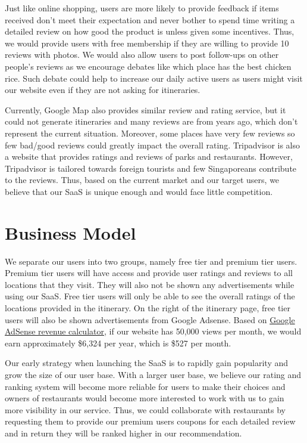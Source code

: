 \documentclass[a4paper]{article}
\begin{document}
Just like online shopping, users are more likely to provide feedback if items received don’t meet their expectation and never bother to spend time writing a detailed review on how good the product is unless given some incentives. Thus, we would provide users with free membership if they are willing to provide 10 reviews with photos. We would also allow users to post follow-ups on other people’s reviews as we encourage debates like which place has the best chicken rice. Such debate could help to increase our daily active users as users might visit our website even if they are not asking for itineraries.

Currently, Google Map also provides similar review and rating service, but it could not generate itineraries and many reviews are from years ago, which don't represent the current situation. Moreover, some places have very few reviews so few bad/good reviews could greatly impact the overall rating. Tripadvisor is also a website that provides ratings and reviews of parks and restaurants. However, Tripadvisor is tailored towards foreign tourists and few Singaporeans contribute to the reviews. Thus, based on the current market and our target users, we believe that our SaaS is unique enough and would face little competition.


\section{Business Model}

We separate our users into two groups, namely free tier and premium tier users. Premium tier users will have access and provide user ratings and reviews to all locations that they visit. They will also not be shown any advertisements while using our SaaS. Free tier users will only be able to see the overall ratings of the locations provided in the itinerary. On the right of the itinerary page, free tier users will also be shown advertisements from Google Adsense. Based on \href{https://www.google.com/adsense/start/#calculator}{Google AdSense revenue calculator}, if our website has 50,000 views per month, we would earn approximately \$6,324 per year, which is \$527 per month.

Our early strategy when launching the SaaS is to rapidly gain popularity and grow the size of our user base. With a larger user base, we believe our rating and ranking system will become more reliable for users to make their choices and owners of restaurants would become more interested to work with us to gain more visibility in our service. Thus, we could collaborate with restaurants by requesting them to provide our premium users coupons for each detailed review and in return they will be ranked higher in our recommendation.
\end{document}

